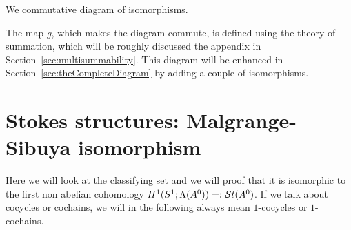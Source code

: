 We  commutative diagram of isomorphisms.
\begin{center}
\end{center}\label{page:ofPreDiagram}
The map $g$, which makes the diagram commute, is defined using the theory of
summation, which will be roughly discussed the appendix in
Section~\ref{sec:multisummability}.
This diagram will be enhanced in Section~\ref{sec:theCompleteDiagram} by
adding a couple of isomorphisms.

\section{Stokes structures: Malgrange-Sibuya isomorphism}\label{sec:mainThm1}
Here we will look at the classifying set and we will proof that it is
isomorphic \TODO[as\dots] to the first non abelian cohomology 
$H^1(S^1;\Lambda(A^0))=:\mathcal{S}{}t(A^0)$.
If we talk about cocycles or cochains, we will in the following always mean
$1$-cocycles or $1$-cochains.

